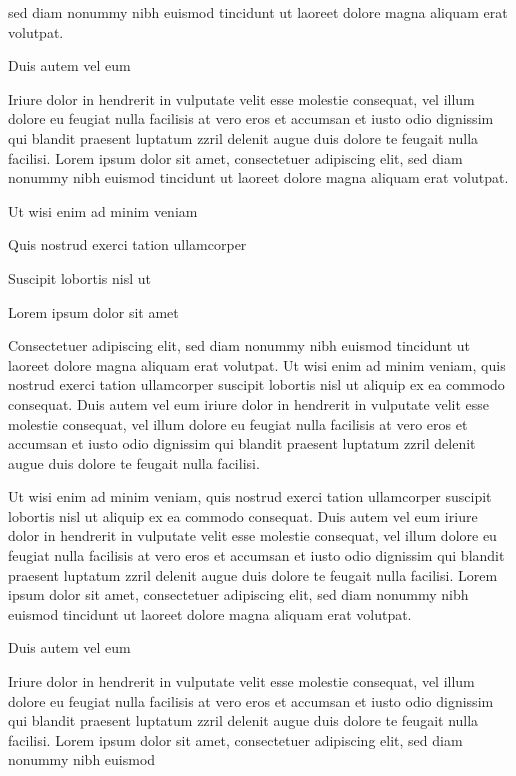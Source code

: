 \documentclass[11pt,twoside]{article}\makeatletter
\begin{document}
      sed diam nonummy nibh euismod tincidunt ut laoreet dolore magna
      aliquam erat volutpat. \par Duis autem vel eum \par Iriure dolor in hendrerit in vulputate velit esse molestie
      consequat, vel illum dolore eu feugiat nulla facilisis at vero eros et
      accumsan et iusto odio dignissim qui blandit praesent luptatum zzril
      delenit augue duis dolore te feugait nulla facilisi. Lorem ipsum dolor
      sit amet, consectetuer adipiscing elit, sed diam nonummy nibh euismod
      tincidunt ut laoreet dolore magna aliquam erat volutpat. \par Ut wisi enim ad minim veniam\par Quis nostrud exerci tation ullamcorper \par Suscipit lobortis nisl ut \par Lorem ipsum dolor sit amet\par Consectetuer adipiscing elit, sed diam nonummy nibh euismod
      tincidunt ut laoreet dolore magna aliquam erat volutpat. Ut wisi enim
      ad minim veniam, quis nostrud exerci tation ullamcorper suscipit
      lobortis nisl ut aliquip ex ea commodo consequat. Duis autem vel eum
      iriure dolor in hendrerit in vulputate velit esse molestie consequat,
      vel illum dolore eu feugiat nulla facilisis at vero eros et accumsan
      et iusto odio dignissim qui blandit praesent luptatum zzril delenit
      augue duis dolore te feugait nulla facilisi.\par Ut wisi enim ad minim veniam, quis nostrud exerci tation
      ullamcorper suscipit lobortis nisl ut aliquip ex ea commodo
      consequat. Duis autem vel eum iriure dolor in hendrerit in vulputate
      velit esse molestie consequat, vel illum dolore eu feugiat nulla
      facilisis at vero eros et accumsan et iusto odio dignissim qui blandit
      praesent luptatum zzril delenit augue duis dolore te feugait nulla
      facilisi. Lorem ipsum dolor sit amet, consectetuer adipiscing elit,
      sed diam nonummy nibh euismod tincidunt ut laoreet dolore magna
      aliquam erat volutpat. \par Duis autem vel eum \par Iriure dolor in hendrerit in vulputate velit esse molestie
      consequat, vel illum dolore eu feugiat nulla facilisis at vero eros et
      accumsan et iusto odio dignissim qui blandit praesent luptatum zzril
      delenit augue duis dolore te feugait nulla facilisi. Lorem ipsum dolor
      sit amet, consectetuer adipiscing elit, sed diam nonummy nibh euismod
\end{document}
